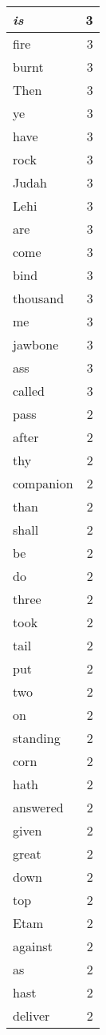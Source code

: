 \begin{center}
\begin{longtable}{l|r}
\emph{is} & 3\\ \hline 
fire & 3\\ \hline 
burnt & 3\\ \hline 
Then & 3\\ \hline 
ye & 3\\ \hline 
have & 3\\ \hline 
rock & 3\\ \hline 
Judah & 3\\ \hline 
Lehi & 3\\ \hline 
are & 3\\ \hline 
come & 3\\ \hline 
bind & 3\\ \hline 
thousand & 3\\ \hline 
me & 3\\ \hline 
jawbone & 3\\ \hline 
ass & 3\\ \hline 
called & 3\\ \hline 
pass & 2\\ \hline 
after & 2\\ \hline 
thy & 2\\ \hline 
companion & 2\\ \hline 
than & 2\\ \hline 
shall & 2\\ \hline 
be & 2\\ \hline 
do & 2\\ \hline 
three & 2\\ \hline 
took & 2\\ \hline 
tail & 2\\ \hline 
put & 2\\ \hline 
two & 2\\ \hline 
on & 2\\ \hline 
standing & 2\\ \hline 
corn & 2\\ \hline 
hath & 2\\ \hline 
answered & 2\\ \hline 
given & 2\\ \hline 
great & 2\\ \hline 
down & 2\\ \hline 
top & 2\\ \hline 
Etam & 2\\ \hline 
against & 2\\ \hline 
as & 2\\ \hline 
hast & 2\\ \hline 
deliver & 2\\ \hline 

\end{longtable}
\end{center}
